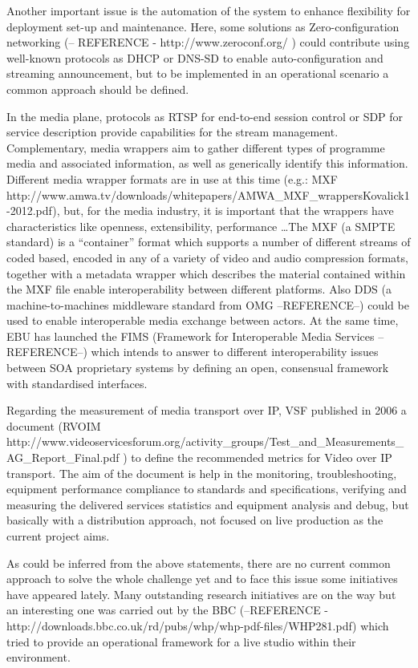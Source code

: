 Another important issue is the automation of the system to enhance flexibility for deployment set-up and maintenance. Here, some solutions as Zero-configuration networking (-- REFERENCE - http://www.zeroconf.org/ ) could contribute using well-known protocols as DHCP or DNS-SD to enable auto-configuration and streaming announcement, but to be implemented in an operational scenario a common approach should be
defined.

In the media plane, protocols as RTSP for end-to-end session control or SDP for service description provide capabilities for the stream management. Complementary, media wrappers aim to gather different types of programme media and associated information, as well as generically identify this information. Different media wrapper formats are in use at this time (e.g.: MXF http://www.amwa.tv/downloads/whitepapers/AMWA_MXF_wrappersKovalick1-2012.pdf), but, for the media industry, it is important that the wrappers have characteristics like openness, extensibility, performance \ldots The MXF (a SMPTE standard) is a “container” format which supports a number of different streams of coded based, encoded in any of a variety of video and audio compression formats, together with a metadata wrapper which describes the material contained within the MXF file enable interoperability
between different platforms. Also DDS (a machine-to-machines middleware standard from OMG --REFERENCE--) could be used to enable interoperable media exchange between actors. At the same time, EBU has launched the FIMS (Framework for Interoperable Media Services --REFERENCE--) which intends to answer to different interoperability issues between SOA proprietary systems by defining an open, consensual framework with standardised interfaces.

Regarding the measurement of media transport over IP, VSF published in 2006 a document (RVOIM http://www.videoservicesforum.org/activity_groups/Test_and_Measurements_AG_Report_Final.pdf ) to define the recommended metrics for Video over IP transport. The aim of the document is help in the monitoring, troubleshooting, equipment performance compliance to standards and specifications, verifying and measuring the delivered services statistics and equipment analysis and debug, but basically with a distribution approach, not focused on live production as the current project aims.

As could be inferred from the above statements, there are no current common approach to solve the whole challenge yet and to face this issue some initiatives have appeared lately. Many outstanding research initiatives are on the way but an interesting one was carried out by the BBC (--REFERENCE - http://downloads.bbc.co.uk/rd/pubs/whp/whp-pdf-files/WHP281.pdf) which tried to provide an operational framework for a live studio within their environment.

